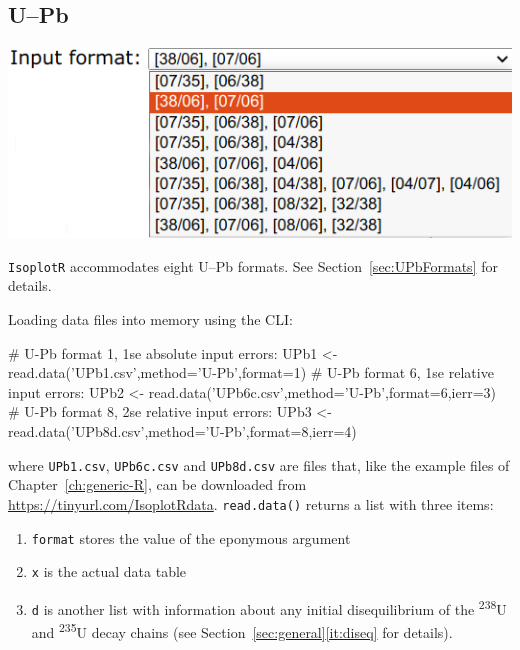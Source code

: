 \begin{refsection}

\chapter{U--Pb}
\label{ch:UPb-R}

\noindent\begin{minipage}[t]{.5\linewidth}
\strut\vspace*{-\baselineskip}\newline
\includegraphics[width=\linewidth]{../figures/UPbFormats.png}\\
\end{minipage}
\begin{minipage}[t]{.5\textwidth}
  \texttt{IsoplotR} accommodates eight U--Pb formats. See
  Section~\ref{sec:UPbFormats} for details.
\end{minipage}

\noindent Loading data files into memory using the CLI:

\begin{script}
# U-Pb format 1, 1se absolute input errors:
UPb1 <- read.data('UPb1.csv',method='U-Pb',format=1)
# U-Pb format 6, 1se relative input errors:
UPb2 <- read.data('UPb6c.csv',method='U-Pb',format=6,ierr=3)
# U-Pb format 8, 2se relative input errors:
UPb3 <- read.data('UPb8d.csv',method='U-Pb',format=8,ierr=4)
\end{script}

\noindent where \texttt{UPb1.csv}, \texttt{UPb6c.csv} and
\texttt{UPb8d.csv} are files that, like the example files of
Chapter~\ref{ch:generic-R}, can be downloaded from
\url{https://tinyurl.com/IsoplotRdata}. \texttt{read.data()} returns a
list with three items:

\begin{enumerate}
\item\texttt{format} stores the value of the eponymous argument
\item\texttt{x} is the actual data table
\item\texttt{d} is another list with information about any initial
  disequilibrium of the \textsuperscript{238}U and
  \textsuperscript{235}U decay chains (see
  Section~\ref{sec:general}\ref{it:diseq} for details).
\end{enumerate}


\end{refsection}
